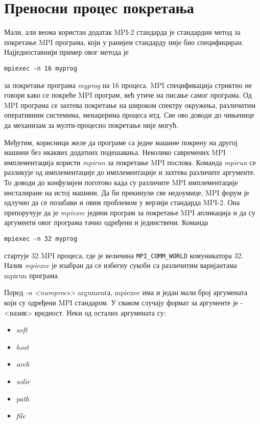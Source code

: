 \section{Преносни процес покретања}

Мали, али веома користан додатак MPI-2 стандарда је стандардни метод за покретање MPI програма, који у ранијем стандарду није био специфициран. Најједноставнији пример овог метода је

\begin{verbatim}
mpiexec -n 16 myprog
\end{verbatim}

за покретање програма \textit{myprog} на  16 процеса. MPI спецификација стриктно не говори како се покреће MPI програм, већ утиче на писање самог програма. Од MPI програма се захтева покретање на широком спектру окружења, различитим оперативним системима, менаџерима процеса итд. Све ово доводи до чињенице да механизам за мулти-процесно покретање није могућ.

Међутим, корисници желе да програме са једне машине покрену на другој машини без икаквих додатних подешавања. Неколико савремених MPI имплементација користи \textit{mpirun}  за покретање MPI послова. Команда \textit{mpirun} се разликује од имплементације до имплементације и захтева различите аргументе. То доводи до конфузијем поготово када су различите MPI имплементације инсталиране на истој машини.
Да би прекинули све недоумице, MPI форум је одлучио да се позабави и овим проблемом у верзији стандарда MPI-2.
Она препоручује да је  \textit{mpiexec} једини програм за покретање  MPI апликација и да су аргументи овог програма тачно одређени и јединствени.
Команда

\begin{verbatim}
mpiexec -n 32 myprog
\end{verbatim}

стартује 32 MPI процеса, где је величина \texttt{MPI\_COMM\_WORLD} комуникатора 32. Назив \textit{mpiexec} је изабран да се избегну сукоби са различитим варијантама mpirun програма.

Поред \textit{-n <numprocs>} argumentа, mpiexec има и један мали број аргумената који су одређени MPI стандаром. У сваком случају формат за аргументе је -<назив> вредност. Неки од осталих аргумената су:
\begin{itemize}
\item \textit{soft}
\item \textit{host}
\item \textit{arch}
\item \textit{wdir}
\item \textit{path}
\item \textit{file}
\end{itemize}

